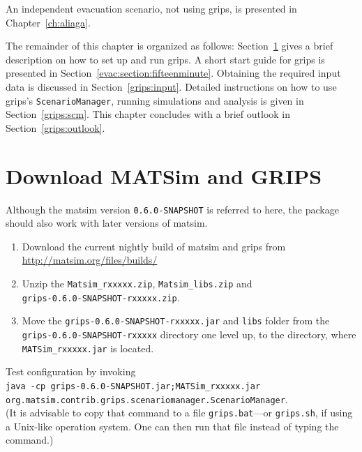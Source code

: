 An independent evacuation scenario, not using \gls{grips}, is presented in Chapter~\ref{ch:aliaga}.

The remainder of this chapter is organized as follows: Section~\ref{grips:install} gives a brief description on how to set up and run \gls{grips}. 
A short start guide for \gls{grips} is presented in Section~\ref{evac:section:fifteenminute}. Obtaining the required input data is discussed in Section~\ref{grips:input}. Detailed instructions on how to use \gls{grips}'s \lstinline|ScenarioManager|, running simulations and analysis is given in Section~\ref{grips:scm}. This chapter concludes with a brief outlook in Section~\ref{grips:outlook}.

\section{Download MATSim and GRIPS}
\label{grips:install}
Although the \gls{matsim} version \lstinline|0.6.0-SNAPSHOT| is referred to here, the package should also work with later versions of \gls{matsim}.
\begin{enumerate}\styleEnumerate
\item 
Download the current nightly build of \gls{matsim} and \gls{grips} from
\url{http://matsim.org/files/builds/}
\item 
Unzip the \lstinline|Matsim_rxxxxx.zip|, \lstinline|Matsim_libs.zip| and\\
 \lstinline|grips-0.6.0-SNAPSHOT-rxxxxx.zip|.
\item 
Move the \lstinline|grips-0.6.0-SNAPSHOT-rxxxxx.jar| and \lstinline|libs| folder from the \lstinline|grips-0.6.0-SNAPSHOT-rxxxxx| directory one level up, 
\ie to the directory, where \lstinline|MATSim_rxxxxx.jar| is located.
\end{enumerate}

Test configuration by invoking\\ 
\lstinline|java -cp grips-0.6.0-SNAPSHOT.jar;MATSim_rxxxxx.jar|\\ \lstinline|org.matsim.contrib.grips.scenariomanager.ScenarioManager|.\\
(It is advisable to copy that command to a file \lstinline|grips.bat|---or \lstinline|grips.sh|, if using a Unix-like operation system. One can then run that file instead of typing the command.)

